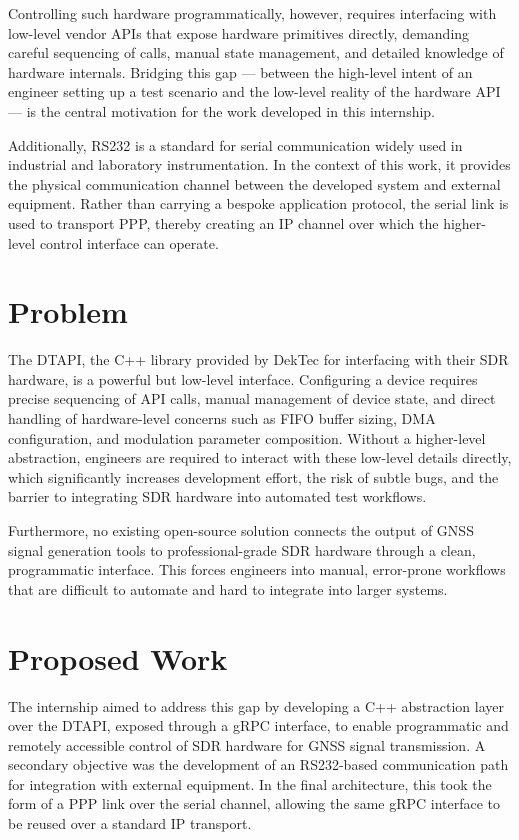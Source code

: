 Controlling such hardware programmatically, however, requires interfacing with
low-level vendor APIs that expose hardware primitives directly, demanding
careful sequencing of calls, manual state management, and detailed knowledge of
hardware internals. Bridging this gap — between the high-level intent of an
engineer setting up a test scenario and the low-level reality of the hardware
API — is the central motivation for the work developed in this internship.

Additionally, \gls{RS232} is a standard for serial communication widely used in
industrial and laboratory instrumentation. In the context of this work, it
provides the physical communication channel between the developed system and
external equipment. Rather than carrying a bespoke application protocol, the
serial link is used to transport \gls{PPP}, thereby creating an IP channel over
which the higher-level control interface can operate.\cite{wikipediaRS232}

\section{Problem}

The \gls{DTAPI}, the C++ library provided by DekTec for interfacing with their
\gls{SDR} hardware, is a powerful but low-level interface. Configuring a device
requires precise sequencing of API calls, manual management of device state,
and direct handling of hardware-level concerns such as FIFO buffer sizing, DMA
configuration, and modulation parameter composition. Without a higher-level
abstraction, engineers are required to interact with these low-level details
directly, which significantly increases development effort, the risk of subtle
bugs, and the barrier to integrating \gls{SDR} hardware into automated test
workflows.

Furthermore, no existing open-source solution connects the output of \gls{GNSS}
signal generation tools to professional-grade \gls{SDR} hardware through a
clean, programmatic interface. This forces engineers into manual, error-prone
workflows that are difficult to automate and hard to integrate into larger
systems.

\section{Proposed Work}

The internship aimed to address this gap by developing a C++ abstraction layer
over the \gls{DTAPI}, exposed through a \gls{gRPC} interface, to enable
programmatic and remotely accessible control of \gls{SDR} hardware for
\gls{GNSS} signal transmission. A secondary objective was the development of an
\gls{RS232}-based communication path for integration with external equipment.
In the final architecture, this took the form of a \gls{PPP} link over the
serial channel, allowing the same gRPC interface to be reused over a standard
IP transport.

